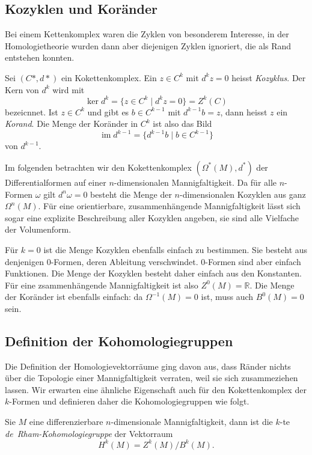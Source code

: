 \subsection{Kozyklen und Koränder}
Bei einem Kettenkomplex waren die Zyklen von besonderem Interesse,
in der Homologietheorie wurden dann aber diejenigen Zyklen ignoriert,
die als Rand entstehen konnten.

\begin{definition}
Sei $(C*,d*)$ ein Kokettenkomplex.
Ein $z\in C^k$ mit $d^kz=0$ heisst \emph{Kozyklus}.
%
Der Kern von $d^k$ wird mit
\[
\ker d^k = \{ z\in C^k\mid d^kz=0\}
=
Z^k(C)
\]
bezeicnnet.
Ist $z\in C^k$ und gibt es $b\in C^{k-1}$ mit $d^{k-1}b=z$, dann 
heisst $z$ ein \emph{Korand}.
%
Die Menge der Koränder in $C^k$ ist also das Bild
\[
\operatorname{im}d^{k-1}
=
\{
d^{k-1}b\mid b\in C^{k-1}
\}
\]
von $d^{k-1}$.
\end{definition}

Im folgenden betrachten wir den Kokettenkomplex $(\Omega^*(M),d^*)$ 
der Differentialformen auf einer $n$-dimensionalen Mannigfaltigkeit.
Da für alle $n$-Formen $\omega$ gilt $d^n\omega=0$ besteht die Menge
der $n$-dimensionalen Kozyklen aus ganz $\Omega^n(M)$.
Für eine orientierbare, zusammenhängende Mannigfaltigkeit lässt sich
sogar eine explizite Beschreibung aller Kozyklen angeben, sie sind
alle Vielfache der Volumenform.

Für $k=0$ ist die Menge Kozyklen ebenfalls einfach zu bestimmen.
Sie besteht aus denjenigen $0$-Formen, deren Ableitung verschwindet.
0-Formen sind aber einfach Funktionen.
Die Menge der Kozyklen besteht daher einfach aus den Konstanten.
Für eine zsammenhängende Mannigfaltigkeit ist also
$Z^0(M)=\mathbb{R}$.
Die Menge der Koränder ist ebenfalls einfach: da $\Omega^{-1}(M)=0$ ist,
muss auch $B^0(M)=0$ sein.

%
%
\subsection{Definition der Kohomologiegruppen}
Die Definition der Homologievektorräume ging davon aus, dass Ränder
nichts über die Topologie einer Mannigfaltigkeit verraten, weil sie
sich zusammeziehen lassen.
Wir erwarten eine ähnliche Eigenschaft auch für den Kokettenkomplex
der $k$-Formen und definieren daher die Kohomologiegruppen wie 
folgt.

\begin{definition}
Sie $M$ eine differenzierbare $n$-dimensionale Mannigfaltigkeit, dann
ist die $k$-te \emph{de~Rham-Kohomologiegruppe} der Vektorraum
%
\[
H^k(M)
=
Z^k(M) / B^k(M).
\]
\end{definition}

